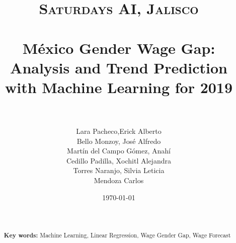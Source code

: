 \documentclass[paper=a4, fontsize=11pt]{scrartcl} %
\title{	
\normalfont \normalsize 
\textsc{Saturdays AI, Jalisco} \\ [25pt] %
\horrule{0.5pt} \\[0.4cm] %
\huge  M\'exico Gender Wage Gap: Analysis and Trend Prediction with Machine Learning for 2019 \\ %
\horrule{2pt} \\[0.5cm] %
}
\author{  Lara Pacheco,Erick Alberto \\ Bello Monzoy, Jos\'e Alfredo \\ Mart\'in del Campo G\'omez, Anah\'i \\ Cedillo Padilla, Xochitl Alejandra \\ Torres Naranjo, Silvia Leticia \\ Mendoza Carlos} %
\date{\normalsize\today} %
\numberwithin{equation}{section} %
\numberwithin{figure}{section} %
\numberwithin{table}{section} %
\begin{document}
\maketitle %

\newpage
\begin{abstract}

{ }\\



  \\


\textbf{Key words:} Machine Learning, Linear Regression, Wage Gender Gap, Wage Forecast
    
\end{abstract}

\newpage
\tableofcontents












\newpage


\end{document}
